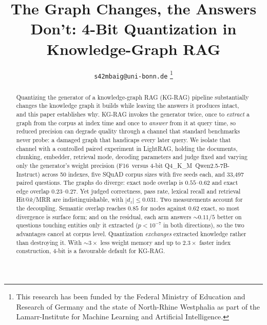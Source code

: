 \documentclass[conference, table]{IEEEtran}
\newcommand{\fsixteen}{F16}
\newcommand{\qfour}{Q4\_K\_M}
\begin{document}
\title{The Graph Changes, the Answers Don't: 4-Bit Quantization in Knowledge-Graph RAG}

\author{
    \texttt{s42mbaig@uni-bonn.de}
    \thanks{This research has been funded by the Federal Ministry of Education and Research of Germany and the state of North-Rhine Westphalia as part of the Lamarr-Institute for Machine Learning and Artificial Intelligence.}
}

\maketitle

\begin{abstract}
Quantizing the generator of a knowledge-graph RAG (KG-RAG) pipeline substantially changes the knowledge graph it builds while leaving the answers it produces intact, and this paper establishes why. KG-RAG invokes the generator twice, once to \emph{extract} a graph from the corpus at index time and once to \emph{answer} from it at query time, so reduced precision can degrade quality through a channel that standard benchmarks never probe: a damaged graph that handicaps every later query. We isolate that channel with a controlled paired experiment in LightRAG, holding the documents, chunking, embedder, retrieval mode, decoding parameters and judge fixed and varying only the generator's weight precision (\fsixteen\ versus 4-bit \qfour\ Qwen2.5-7B-Instruct) across 50 indexes, five SQuAD corpus sizes with five seeds each, and 33{,}497 paired questions. The graphs do diverge: exact node overlap is $0.55$--$0.62$ and exact edge overlap $0.23$--$0.27$. Yet judged correctness, pass rate, lexical recall and retrieval Hit@$k$/MRR are indistinguishable, with $|d_z| \leq 0.031$. Two measurements account for the decoupling. Semantic overlap reaches $0.85$ for nodes against $0.62$ exact, so most divergence is surface form; and on the residual, each arm answers $\sim\!0.11/5$ better on questions touching entities only it extracted ($p < 10^{-7}$ in both directions), so the two advantages cancel at corpus level. Quantization \emph{exchanges} extracted knowledge rather than destroying it. With $\sim\!3\times$ less weight memory and up to $2.3\times$ faster index construction, 4-bit is a favourable default for KG-RAG.
\end{abstract}
\end{document}

